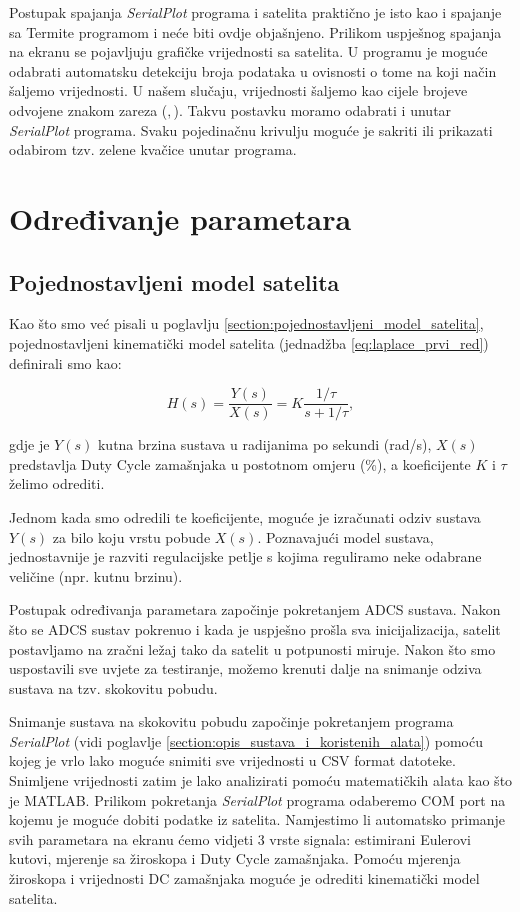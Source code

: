 \documentclass[times, utf8, diplomski, numeric]{templates/template}
\begin{document}
{{        Postupak spajanja \emph{SerialPlot} programa i satelita praktično je isto kao i spajanje sa Termite programom i neće biti ovdje objašnjeno. Prilikom uspješnog spajanja na ekranu se pojavljuju grafičke vrijednosti sa satelita. U programu je moguće odabrati automatsku detekciju broja podataka u ovisnosti o tome na koji način šaljemo vrijednosti. U našem slučaju, vrijednosti šaljemo kao cijele brojeve odvojene znakom zareza ($,$). Takvu postavku moramo odabrati i unutar \emph{SerialPlot} programa. Svaku pojedinačnu krivulju moguće je sakriti ili prikazati odabirom tzv. zelene kvačice unutar programa. 
    }

    \section{Određivanje parametara}{
        \subsection{Pojednostavljeni model satelita}{
        \label{subsection:kinematicki_model}
            Kao što smo već pisali u poglavlju \ref{section:pojednostavljeni_model_satelita}, pojednostavljeni kinematički model satelita (jednadžba \ref{eq:laplace_prvi_red}) definirali smo kao:

            \begin{equation}
                H(s) = \frac{Y(s)}{X(s)} = K \frac{1/\tau}{s + 1/\tau},
            \end{equation}

            gdje je $Y(s)$ kutna brzina sustava u radijanima po sekundi (rad/s), $X(s)$ predstavlja Duty Cycle zamašnjaka u postotnom omjeru (\%), a koeficijente $K$ i $\tau$ želimo odrediti.

            Jednom kada smo odredili te koeficijente, moguće je izračunati odziv sustava $Y(s)$ za bilo koju vrstu pobude $X(s)$. Poznavajući model sustava, jednostavnije je razviti regulacijske petlje s kojima reguliramo neke odabrane veličine (npr. kutnu brzinu).

            Postupak određivanja parametara započinje pokretanjem ADCS sustava. Nakon što se ADCS sustav pokrenuo i kada je uspješno prošla sva inicijalizacija, satelit postavljamo na zračni ležaj tako da satelit u potpunosti miruje. Nakon što smo uspostavili sve uvjete za testiranje, možemo krenuti dalje na snimanje odziva sustava na tzv. skokovitu  pobudu.

            Snimanje sustava na skokovitu pobudu započinje pokretanjem programa \emph{SerialPlot} (vidi poglavlje \ref{section:opis_sustava_i_koristenih_alata}) pomoću kojeg je vrlo lako moguće snimiti sve vrijednosti u CSV format datoteke. Snimljene vrijednosti zatim je lako analizirati pomoću matematičkih alata kao što je MATLAB. Prilikom pokretanja \emph{SerialPlot} programa odaberemo COM port na kojemu je moguće dobiti podatke iz satelita. Namjestimo li automatsko primanje svih parametara na ekranu ćemo vidjeti 3 vrste signala: estimirani Eulerovi kutovi, mjerenje sa žiroskopa i Duty Cycle zamašnjaka. Pomoću mjerenja žiroskopa i vrijednosti DC zamašnjaka moguće je odrediti kinematički model satelita. 

}}}
\end{document}
